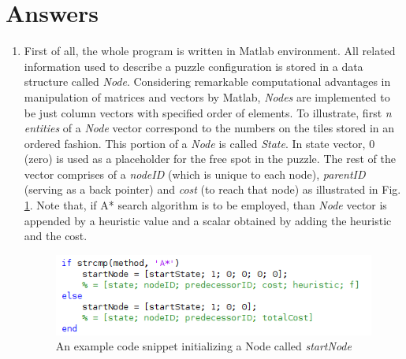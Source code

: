 \documentclass[12pt]{article}
\begin{document}





\section{Answers}
\begin{enumerate}
	\item [\textbf{1}] 
	First of all, the whole program is written in Matlab environment. 
	All related information used to describe a puzzle configuration is stored in a data structure called \textit{Node}. 
	Considering remarkable computational advantages in manipulation of matrices and vectors by Matlab, \textit{Nodes} are implemented to be just column vectors with specified order of elements. 
	To illustrate, first \textit{n entities} of a \textit{Node} vector correspond to the numbers on the tiles stored in an ordered fashion. 
	This portion of a \textit{Node} is called \textit{State}. 
	In state vector, 0 (zero) is used as a placeholder for the free spot in the puzzle.	
	The rest of the vector comprises of a \textit{nodeID} (which is unique to each node), \textit{parentID} (serving as a back pointer) and \textit{cost} (to reach that node) as illustrated in Fig. \ref{fig:NodeStruct}. 
	Note that, if A* search algorithm is to be employed, than \textit{Node} vector is appended by a heuristic value and a scalar obtained by adding the heuristic and the cost. 
		
	\begin{figure}[!htb]
		\centering
		\includegraphics[width=.7\textwidth]{images/NodeDefinition.png}
		\caption{An example code snippet initializing a Node called \textit{startNode}}
		\centering
		\label{fig:NodeStruct}
	\end{figure}
	

\end{enumerate}
\end{document}
